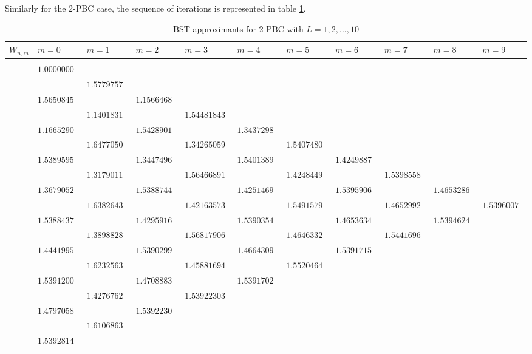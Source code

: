 \documentclass[3p, 10pt, onecolumn]{elsarticle}
\begin{document}
Similarly for the 2-PBC case, the sequence of iterations is represented in
table \ref{Table:BST2PBC}.

\begin{table}[tbp] \centering%
%
%
\scriptsize
\begin{tabular}{lllllllllll}
\hline\hline
$W_{n,m}$ & $m=0$ & $m=1$ & $m=2$ & $m=3$ & $m=4$ & $m=5$ & $m=6$ & $m=7$ & $%
m=8$ & $m=9$ \\ \hline
&  &  &  &  &  &  &  &  &  &  \\ 
& $1.000000000$ &  &  &  &  &  &  &  &  &  \\ 
&  & $1.577975700$ &  &  &  &  &  &  &  &  \\ 
& $1.565084580$ &  & $1.156646890$ &  &  &  &  &  &  &  \\ 
&  & $1.140183112$ &  & $1.5448184389$ &  &  &  &  &  &  \\ 
& $1.166529040$ &  & $1.542890160$ &  & $1.343729852$ &  &  &  &  &  \\ 
&  & $1.647705037$ &  & $1.3426505965$ &  & $1.540748058$ &  &  &  &  \\ 
& $1.538959531$ &  & $1.344749629$ &  & $1.540138974$ &  & $1.424988740$ & 
&  &  \\ 
&  & $1.317901102$ &  & $1.5646689105$ &  & $1.424844904$ &  & $1.539855817$
&  &  \\ 
& $1.367905267$ &  & $1.538874475$ &  & $1.425146964$ &  & $1.539590605$ & 
& $1.465328620$ &  \\ 
&  & $1.638264392$ &  & $1.4216357309$ &  & $1.549157927$ &  & $1.465299279$
&  & $1.539600730$ \\ 
& $1.538843701$ &  & $1.429591658$ &  & $1.539035457$ &  & $1.465363450$ & 
& $1.539462458$ &  \\ 
&  & $1.389882824$ &  & $1.5681790646$ &  & $1.464633278$ &  & $1.544169675$
&  &  \\ 
& $1.444199558$ &  & $1.539029999$ &  & $1.466430923$ &  & $1.539171586$ & 
&  &  \\ 
&  & $1.623256319$ &  & $1.4588169435$ &  & $1.552046417$ &  &  &  &  \\ 
& $1.539120096$ &  & $1.470888365$ &  & $1.539170223$ &  &  &  &  &  \\ 
&  & $1.427676251$ &  & $1.5392230356$ &  &  &  &  &  &  \\ 
& $1.479705887$ &  & $1.539223036$ &  &  &  &  &  &  &  \\ 
&  & $1.610686315$ &  &  &  &  &  &  &  &  \\ 
& $1.539281498$ &  &  &  &  &  &  &  &  &  \\ \hline\hline
\end{tabular}%
\caption{BST approximants for 2-PBC with $L=1,2,...,10$}\label{Table:BST2PBC}%
\end{table}%
\end{document}
